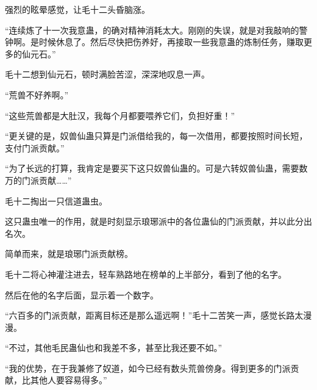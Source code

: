 \begin{this_body}
强烈的眩晕感觉，让毛十二头昏脑涨。

“连续炼了十一次我意蛊，的确对精神消耗太大。刚刚的失误，就是对我敲响的警钟啊。是时候休息了。然后尽快把伤养好，再接取一些我意蛊的炼制任务，赚取更多的仙元石。”

毛十二想到仙元石，顿时满脸苦涩，深深地叹息一声。

“荒兽不好养啊。”

“这些荒兽都是大肚汉，我每个月都要喂养它们，负担好重！”

“更关键的是，奴兽仙蛊只算是门派借给我的，每一次借用，都要按照时间长短，支付门派贡献。”

“为了长远的打算，我肯定是要买下这只奴兽仙蛊的。可是六转奴兽仙蛊，需要数万的门派贡献……”

毛十二掏出一只信道蛊虫。

这只蛊虫唯一的作用，就是时刻显示琅琊派中的各位蛊仙的门派贡献，并以此分出名次。

简单而来，就是琅琊门派贡献榜。

毛十二将心神灌注进去，轻车熟路地在榜单的上半部分，看到了他的名字。

然后在他的名字后面，显示着一个数字。

“六百多的门派贡献，距离目标还是那么遥远啊！”毛十二苦笑一声，感觉长路太漫漫。

“不过，其他毛民蛊仙也和我差不多，甚至比我还要不如。”

“我的优势，在于我兼修了奴道，如今已经有数头荒兽傍身。得到更多的门派贡献，比其他人要容易得多。”

\end{this_body}


